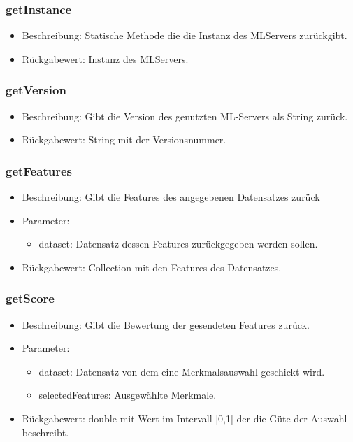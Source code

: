\documentclass[a4paper]{scrreprt}
\begin{document}
    \subsubsection{getInstance}
    \begin{itemize}
        \item Beschreibung: Statische Methode die die Instanz des MLServers zurückgibt.
        \item Rückgabewert: Instanz des MLServers.
    \end{itemize}

    \subsubsection{getVersion}
    \begin{itemize}
        \item Beschreibung: Gibt die Version des genutzten ML-Servers als String zurück.
        \item Rückgabewert: String mit der Versionsnummer.
    \end{itemize}

    \subsubsection{getFeatures}
    \begin{itemize}
        \item Beschreibung: Gibt die Features des angegebenen Datensatzes zurück
        \item Parameter:
            \begin{itemize}
                \item dataset: Datensatz dessen Features zurückgegeben werden sollen.
            \end{itemize}
        \item Rückgabewert: Collection mit den Features des Datensatzes.
    \end{itemize}

    \subsubsection{getScore}
    \begin{itemize}
        \item Beschreibung: Gibt die Bewertung der gesendeten Features zurück.
        \item Parameter:
            \begin{itemize}
                \item dataset: Datensatz von dem eine Merkmalsauswahl geschickt wird.
                \item selectedFeatures: Ausgewählte Merkmale.
            \end{itemize}
        \item Rückgabewert: double mit Wert im Intervall [0,1] der die Güte der Auswahl beschreibt.
    \end{itemize}
\end{document}

